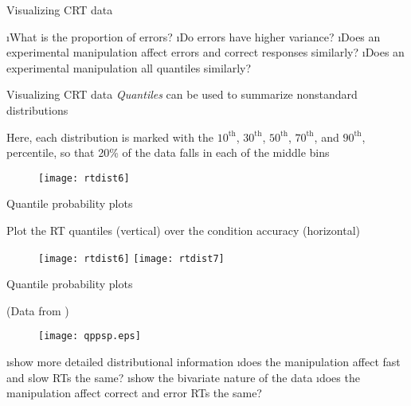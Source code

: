 \documentclass[aspectratio=169]{beamer}
\begin{document}
\begin{frame}[fragile]{Visualizing CRT data}

\bi
\i What is the proportion of errors?
\i Do errors have higher variance?
\i Does an experimental manipulation affect errors and correct responses similarly?
\i Does an experimental manipulation all quantiles similarly?
\ei

\end{frame}


\begin{frame}[fragile]{Visualizing CRT data}
\vspace{-3ex}
\emph{Quantiles} can be used to summarize nonstandard distributions\pause

Here, each distribution is marked with the
$10^\text{th}$,
$30^\text{th}$,
$50^\text{th}$,
$70^\text{th}$, and
$90^\text{th}$, percentile, so that 20\% of the data falls in each of the middle bins\pause
\begin{figure}[htp]
\centering\vspace{-4ex}
\texttt{[image: rtdist6]}
\end{figure}

\end{frame}

\begin{frame}[fragile]{Quantile probability plots \cite{Simen2009}}

Plot the RT quantiles (vertical) over the condition accuracy (horizontal)

\begin{figure}[htp]
{\texttt{[image: rtdist6]}}
{\texttt{[image: rtdist7]}}
\end{figure}

\end{frame}



\begin{frame}[fragile]{Quantile probability plots \cite{Simen2009}}

\begin{flushright}\footnotesize
(Data from )
\end{flushright}
\begin{figure}[htp]
\centering
\texttt{[image: qppsp.eps]}
\end{figure}\pause

\bi
\i show more detailed distributional information
\bi
\i does the manipulation affect fast and slow RTs the same?
\ei
\i show the bivariate nature of the data
\bi
\i does the manipulation affect correct and error RTs the same?
\ei
\ei
\end{frame}
\end{document}
